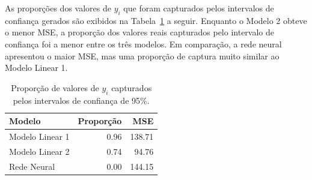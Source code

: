 \documentclass[
  a4paperpaper,
]{article}
\newenvironment{Shaded}{\begin{snugshade}}{\end{snugshade}}
\newcommand{\AttributeTok}[1]{\textcolor[rgb]{0.40,0.45,0.13}{#1}}
\newcommand{\CommentTok}[1]{\textcolor[rgb]{0.37,0.37,0.37}{#1}}
\newcommand{\DecValTok}[1]{\textcolor[rgb]{0.68,0.00,0.00}{#1}}
\newcommand{\FloatTok}[1]{\textcolor[rgb]{0.68,0.00,0.00}{#1}}
\newcommand{\FunctionTok}[1]{\textcolor[rgb]{0.28,0.35,0.67}{#1}}
\newcommand{\NormalTok}[1]{\textcolor[rgb]{0.00,0.23,0.31}{#1}}
\newcommand{\OtherTok}[1]{\textcolor[rgb]{0.00,0.23,0.31}{#1}}
\newcommand{\SpecialCharTok}[1]{\textcolor[rgb]{0.37,0.37,0.37}{#1}}
\begin{document}
\begin{Shaded}
\end{Shaded}

As proporções dos valores de \(y_i\) que foram capturados pelos
intervalos de confiança gerados são exibidos na
Tabela~\ref{tbl-intervalos-confianca} a seguir. Enquanto o Modelo 2
obteve o menor MSE, a proporção dos valores reais capturados pelo
intervalo de confiança foi a menor entre os três modelos. Em comparação,
a rede neural apresentou o maior MSE, mas uma proporção de captura muito
similar ao Modelo Linear 1.

\begin{longtable}[]{@{}lrr@{}}

\caption{\label{tbl-intervalos-confianca}Proporção de valores de \(y_i\)
capturados pelos intervalos de confiança de 95\%.}

\tabularnewline

\toprule\noalign{}
Modelo & Proporção & MSE \\
\midrule\noalign{}
\endhead
\bottomrule\noalign{}
\endlastfoot
Modelo Linear 1 & 0.96 & 138.71 \\
Modelo Linear 2 & 0.74 & 94.76 \\
Rede Neural & 0.00 & 144.15 \\

\end{longtable}
\end{document}
